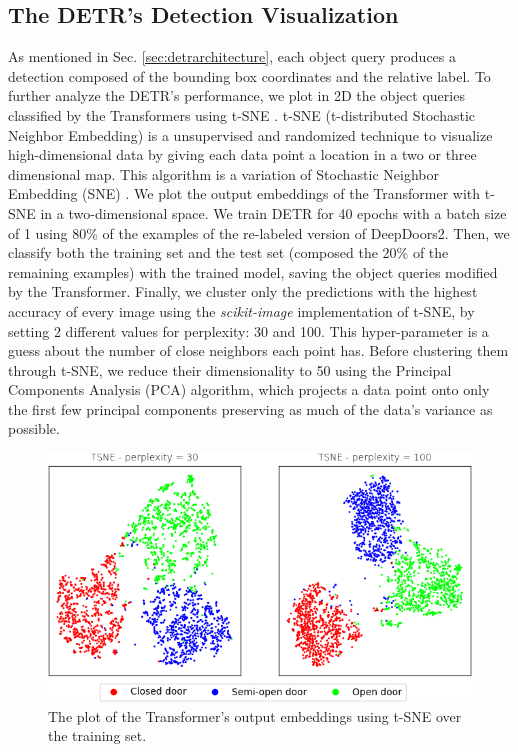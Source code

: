 \subsection{The DETR's Detection Visualization}
As mentioned in Sec. \ref{sec:detrarchitecture}, each object query produces a detection composed of the bounding box coordinates and the relative label. To further analyze the DETR's performance, we plot in 2D the object queries classified by the Transformers using t-SNE \cite{tsne}. t-SNE (t-distributed Stochastic Neighbor Embedding) is a unsupervised and randomized technique to visualize high-dimensional data by giving each data point a location in a two or three dimensional map. This algorithm is a variation of Stochastic Neighbor Embedding (SNE) \cite{sne}. We plot the output embeddings of the Transformer with t-SNE in a two-dimensional space. We train DETR for 40 epochs with a batch size of 1 using 80\% of the examples of the re-labeled version of DeepDoors2. Then, we classify both the training set and the test set (composed the 20\% of the remaining examples) with the trained model, saving the object queries modified by the Transformer. Finally, we cluster only the predictions with the highest accuracy of every image using the \textit{scikit-image} implementation of t-SNE, by setting 2 different values for perplexity: 30 and 100. This hyper-parameter is a guess about the number of close neighbors each point has. Before clustering them through t-SNE, we reduce their dimensionality to 50 using the Principal Components Analysis (PCA) \cite{pca} algorithm, which projects a data point onto only the first few principal components preserving as much of the data's variance as possible. 

\begin{figure}[h!]
	\centering
	\includegraphics[width=\linewidth]{images/deep_doors_2_tsne_trainset.png}
	\caption{The plot of the Transformer's output embeddings using t-SNE over the training set.}
	\label{fig:tsne_deep_doors2_train}
\end{figure}

